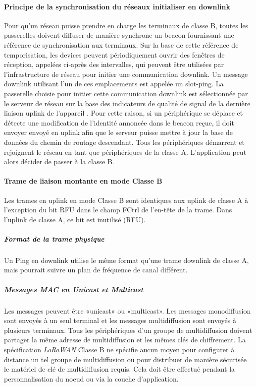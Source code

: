 \documentclass[11pt]{article}
\begin{document}
\paragraph{Principe de la synchronisation du réseaux initialiser en downlink}
Pour qu'un réseau puisse prendre en charge les terminaux de classe B, toutes les passerelles doivent diffuser de manière synchrone un beacon fournissant une référence de synchronisation aux terminaux. Sur la base de cette référence de temporisation, les devices peuvent périodiquement ouvrir des fenêtres de réception, appelées ci-après des intervalles, qui peuvent être utilisées par l'infrastructure de réseau pour initier une communication downlink. Un message downlink utilisant l'un de ces emplacements est appelée un slot-ping. La passerelle choisie pour initier cette communication downlink est sélectionnée par le serveur de réseau sur la base des indicateurs de qualité de signal de la dernière liaison uplink de l'appareil . Pour cette raison, si un périphérique se déplace et détecte une modification de l'identité annoncée dans le beacon reçue, il doit envoyer envoyé en uplink afin que le serveur puisse mettre à jour la base de données du chemin de routage descendant.
Tous les périphériques démarrent et rejoignent le réseau en tant que périphériques de la classe A. L'application peut alors décider de passer à la classe B.


\paragraph{Trame de liaison montante en mode Classe B}
Les trames en uplink en mode Classe B sont identiques aux uplink de classe A à l'exception du bit RFU dans le champ FCtrl de l'en-tête de la trame. Dans l'uplink de classe A, ce bit est inutilisé (RFU). 
\subparagraph{Format de la trame physique}
Un Ping en downlink utilise le même format qu'une trame downlink de classe A, mais pourrait suivre un plan de fréquence de canal différent.
\subparagraph{Messages MAC en Unicast et Multicast}
Les messages peuvent être «unicast» ou «multicast». Les messages monodiffusion sont envoyés à un seul terminal et les messages multidiffusion sont envoyés à plusieurs terminaux. Tous les périphériques d'un groupe de multidiffusion doivent partager la même adresse de multidiffusion et les mêmes clés de chiffrement. La spécification  \textit{LoRaWAN} Classe B ne spécifie aucun moyen pour configurer à distance un tel groupe de multidiffusion ou pour distribuer de manière sécurisée le matériel de clé de multidiffusion requis. Cela doit être effectué pendant la personnalisation du noeud ou via la couche d'application.
\end{document}
